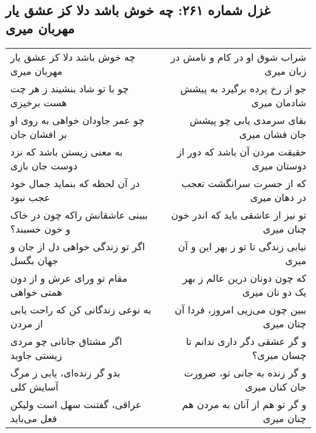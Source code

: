 \begin{center}
\section*{غزل شماره ۲۶۱: چه خوش باشد دلا کز عشق یار مهربان میری}
\label{sec:261}
\begin{longtable}{l p{0.5cm} r}
چه خوش باشد دلا کز عشق یار مهربان میری
&&
شراب شوق او در کام و نامش در زبان میری
\\
چو با تو شاد بنشیند ز هر چت هست برخیزی
&&
جو از رخ پرده برگیرد به پیشش شادمان میری
\\
چو عمر جاودان خواهی به روی او بر افشان جان
&&
بقای سرمدی یابی چو پیشش جان فشان میری
\\
به معنی زیستن باشد که نزد دوست جان بازی
&&
حقیقت مردن آن باشد که دور از دوستان میری
\\
در آن لحظه که بنماید جمال خود عجب نبود
&&
که از حسرت سرانگشت تعجب در دهان میری
\\
ببینی عاشقانش راکه چون در خاک و خون خسبند؟
&&
تو نیز از عاشقی باید که اندر خون چنان میری
\\
اگر تو زندگی خواهی دل از جان و جهان بگسل
&&
نیابی زندگی تا تو ز بهر این و آن میری
\\
مقام تو ورای عرش و از دون همتی خواهی
&&
که چون دونان درین عالم ز بهر یک دو نان میری
\\
به نوعی زندگانی کن که راحت یابی از مردن
&&
ببین چون می‌زیی امروز، فردا آن چنان میری
\\
اگر مشتاق جانانی چو مردی زیستی جاوید
&&
و گر عشقی دگر داری ندانم تا چسان میری؟
\\
بدو گر زنده‌ای، یابی ز مرگ آسایش کلی
&&
و گر زنده به جانی تو، ضرورت جان کنان میری
\\
عراقی، گفتنت سهل است ولیکن فعل می‌باید
&&
و گر تو هم از آنان به مردن هم چنان میری
\\
\end{longtable}
\end{center}
